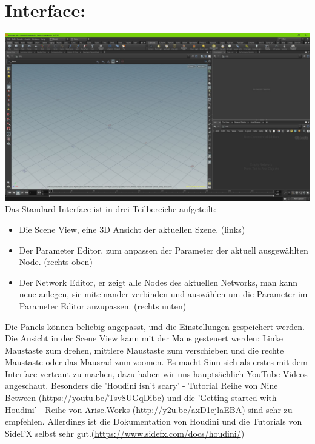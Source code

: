 \documentclass[paper=a4,fontsize=12pt,ngerman]{scrartcl}
\begin{document}
	\section*{\textcolor{rosa}{Interface:}}
	\includegraphics[width=\textwidth]{graphics/Interface.jpg}
	Das Standard-Interface ist in drei Teilbereiche aufgeteilt: 
	\begin{itemize}
		\item Die Scene View, eine 3D Ansicht der aktuellen Szene. (links)
		\item Der Parameter Editor, zum anpassen der Parameter der aktuell ausgewählten Node. (rechts oben)
		\item Der Network Editor, er zeigt alle Nodes des aktuellen Networks, man kann neue anlegen, sie miteinander verbinden und auswählen um die Parameter im Parameter Editor anzupassen. (rechts unten)
	\end{itemize}
	Die Panels können beliebig angepasst, und die Einstellungen gespeichert werden. Die Ansicht in der Scene View kann mit der Maus gesteuert werden: Linke Maustaste zum drehen, mittlere Maustaste zum verschieben und die rechte Maustaste oder das Mausrad zum zoomen. Es macht Sinn sich als erstes mit dem Interface vertraut zu machen, dazu haben wir uns hauptsächlich YouTube-Videos angeschaut. Besonders die 'Houdini isn't scary' - Tutorial Reihe von Nine Between (\url{https://youtu.be/Tsv8UGqDibc}) und die 'Getting started with Houdini' - Reihe von Arise.Works (\url{http://y2u.be/axD1ejlaEBA}) sind sehr zu empfehlen. Allerdings ist die Dokumentation von Houdini und die Tutorials von SideFX selbst sehr gut.(\url{https://www.sidefx.com/docs/houdini/})
	
\end{document}
